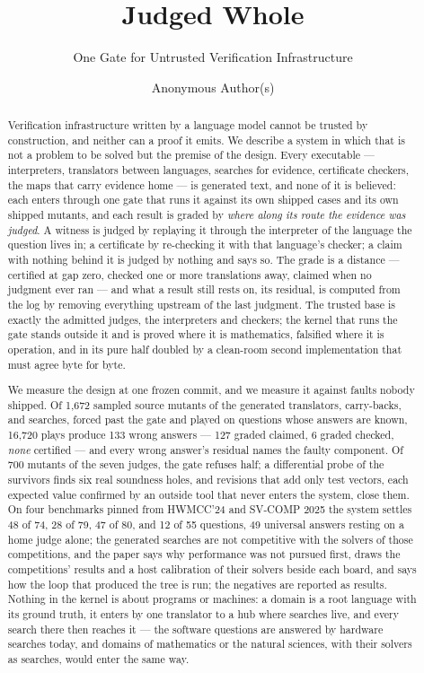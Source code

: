 \documentclass[acmsmall,screen,review,anonymous,nonacm]{acmart}
\begin{document}
\title{Judged Whole}
\subtitle{One Gate for Untrusted Verification Infrastructure}

\author{Anonymous Author(s)}

\begin{abstract}
Verification infrastructure written by a language model cannot be
trusted by construction, and neither can a proof it emits. We
describe a system in which that is not a problem to be solved but the
premise of the design. Every executable --- interpreters, translators
between languages, searches for evidence, certificate checkers, the
maps that carry evidence home --- is generated text, and none of it
is believed: each enters through one gate that runs it against its
own shipped cases and its own shipped mutants, and each result is
graded by \emph{where along its route the evidence was judged}. A
witness is judged by replaying it through the interpreter of the
language the question lives in; a certificate by re-checking it with
that language's checker; a claim with nothing behind it is judged by
nothing and says so. The grade is a distance --- certified at gap
zero, checked one or more translations away, claimed when no judgment
ever ran --- and what a result still rests on, its residual, is
computed from the log by removing everything upstream of the last
judgment. The trusted base is exactly the admitted judges, the
interpreters and checkers; the kernel
that runs the gate stands outside it and is proved where it is
mathematics, falsified where it is operation, and in its pure half
doubled by a clean-room second implementation that must agree byte
for byte.

We measure the design at one frozen commit, and we measure it against
faults nobody shipped. Of 1,672 sampled source mutants of the
generated translators, carry-backs, and searches, forced past the
gate and played on questions whose answers are known, 16,720 plays
produce 133 wrong answers --- 127 graded claimed, 6 graded checked,
\emph{none} certified --- and every wrong answer's residual names the
faulty component. Of 700 mutants of the seven judges, the gate
refuses half; a differential probe of the survivors finds six real
soundness holes, and revisions that add only test vectors, each
expected value confirmed by an outside tool that never enters the
system, close them. On four benchmarks pinned from HWMCC'24 and
SV-COMP 2025 the system settles 48 of 74, 28 of 79, 47 of 80, and 12
of 55 questions, 49 universal answers resting on a home judge alone;
the generated searches are not competitive with the solvers of those
competitions, and the paper says why performance was not pursued
first, draws the competitions' results and a host calibration of
their solvers beside each board, and says how the loop that produced
the tree is run; the negatives are reported as results. Nothing in
the kernel is about programs or machines: a domain is a root language
with its ground truth, it enters by one translator to a hub where searches
live, and every search there then reaches it --- the software
questions are answered by hardware searches today, and domains of
mathematics or the natural sciences, with their solvers as searches,
would enter the same way.
\end{abstract}
\end{document}
